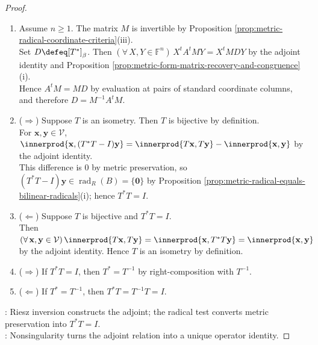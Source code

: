 \begin{proposition}
\begin{proof}
\begin{enumerate}[label=(\roman*)]
If $S\in\LL(\mathcal{V})$ satisfies this identity, then $\tau\circ S=F=\tau\circ T^*$. Hence $S=T^*$ by injectivity of $\tau$.
\item[$(ii)$] Assume $n\geq1$. The matrix $M$ is invertible by Proposition \ref{prop:metric-radical-coordinate-criteria}(iii).\\
Set $D\defeq[T^*]_{\beta}$. Then $(\forall\,X,Y\in\mathbb{F}^n)\,X^tA^tMY=X^tMDY$ by the adjoint identity and Proposition \ref{prop:metric-form-matrix-recovery-and-congruence}(i).\\
Hence $A^tM=MD$ by evaluation at pairs of standard coordinate columns, and therefore $D=M^{-1}A^tM$.
\item[$(iii)$] ($\Rightarrow$) Suppose $T$ is an isometry. Then $T$ is bijective by definition.\\
For $\mathbf{x},\mathbf{y}\in\mathcal{V}$, $\innerprod{\mathbf{x},(T^*T-I)\mathbf{y}}=\innerprod{T\mathbf{x},T\mathbf{y}}-\innerprod{\mathbf{x},\mathbf{y}}$ by the adjoint identity.\\
This difference is $0$ by metric preservation, so $(T^*T-I)\mathbf{y}\in\operatorname{rad}_{R}(B)=\{\mathbf{0}\}$ by Proposition \ref{prop:metric-radical-equals-bilinear-radicals}(i); hence $T^*T=I$.
\item[$(iii)$] ($\Leftarrow$) Suppose $T$ is bijective and $T^*T=I$.\\
Then $(\forall\,\mathbf{x},\mathbf{y}\in\mathcal{V})\,\innerprod{T\mathbf{x},T\mathbf{y}}=\innerprod{\mathbf{x},T^*T\mathbf{y}}=\innerprod{\mathbf{x},\mathbf{y}}$ by the adjoint identity. Hence $T$ is an isometry by definition.
\item[$(iv)$] ($\Rightarrow$) If $T^*T=I$, then $T^*=T^{-1}$ by right-composition with $T^{-1}$.
\item[$(iv)$] ($\Leftarrow$) If $T^*=T^{-1}$, then $T^*T=T^{-1}T=I$.
\end{enumerate}
: Riesz inversion constructs the adjoint; the radical test converts metric preservation into $T^*T=I$.\\
: Nonsingularity turns the adjoint relation into a unique operator identity.
\end{proof}
\end{proposition}

